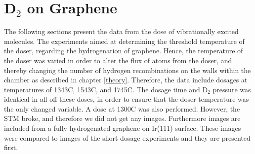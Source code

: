 \section{D$_2$ on Graphene}

The following sections present the data from the dose of vibrationally excited molecules. The experiments aimed at determining the threshold temperature of the doser, regarding the hydrogenation of graphene. Hence, the temperature of the doser was varied in order to alter the flux of atoms from the doser, and thereby changing the number of hydrogen recombinations on the walls within the chamber as described in chapter \ref{theory}. Therefore, the data include dosages at temperatures of 1343\degree C, 1543\degree C, and 1745\degree C. The dosage time and D$_2$ pressure was identical in all off these doses, in order to ensure that the doser temperature was the only changed variable. A dose at 1300\degree C was also performed. However, the STM broke, and therefore we did not get any images. Furthermore images are included from a fully hydrogenated graphene on Ir(111) surface. These images were compared to images of the short dosage experiments and they are presented first.

